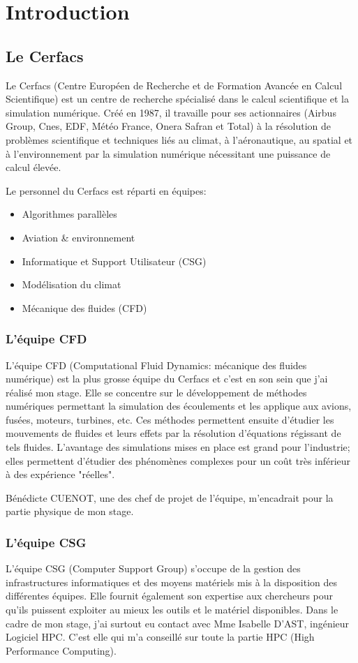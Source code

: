 \section*{Introduction}
\subsection{Le Cerfacs}\label{sec:intro}

Le Cerfacs (Centre Européen de Recherche et de Formation Avancée en Calcul Scientifique) est un centre de recherche spécialisé dans le calcul scientifique et la simulation numérique. Créé en 1987, il travaille pour ses actionnaires (Airbus Group, Cnes, EDF, Météo France, Onera Safran et Total) à la résolution de problèmes scientifique et techniques liés au climat, à l'aéronautique, au spatial et à l'environnement par la simulation numérique nécessitant une puissance de calcul élevée.


Le personnel du Cerfacs est réparti en équipes:
\begin{itemize}
\item Algorithmes parallèles
\item Aviation \& environnement
\item Informatique et Support Utilisateur (CSG)
\item Modélisation du climat
\item Mécanique des fluides (CFD)
\end{itemize}

\subsubsection{L'équipe CFD}
L'équipe CFD (Computational Fluid Dynamics: mécanique des fluides numérique) est la plus grosse équipe du Cerfacs et c'est en son sein que j'ai réalisé mon stage. Elle se concentre sur le développement de méthodes numériques permettant la simulation des écoulements et les applique aux avions, fusées, moteurs, turbines, etc. Ces méthodes permettent ensuite d'étudier les mouvements de fluides et leurs effets par la résolution d'équations régissant de tels fluides. L'avantage des simulations mises en place est grand pour l'industrie; elles permettent d'étudier des phénomènes complexes pour un coût très inférieur à des expérience "réelles".

Bénédicte CUENOT, une des chef de projet de l'équipe, m'encadrait pour la partie physique de mon stage.


\subsubsection{L'équipe CSG}
L'équipe CSG (Computer Support Group) s'occupe de la gestion des infrastructures informatiques et des moyens matériels mis à la disposition des différentes équipes. Elle fournit également son expertise aux chercheurs pour qu'ils puissent exploiter au mieux les outils et le matériel disponibles.
Dans le cadre de mon stage, j'ai surtout eu contact avec Mme Isabelle D'AST, ingénieur Logiciel HPC. C'est elle qui m'a conseillé sur toute la partie HPC (High Performance Computing).

